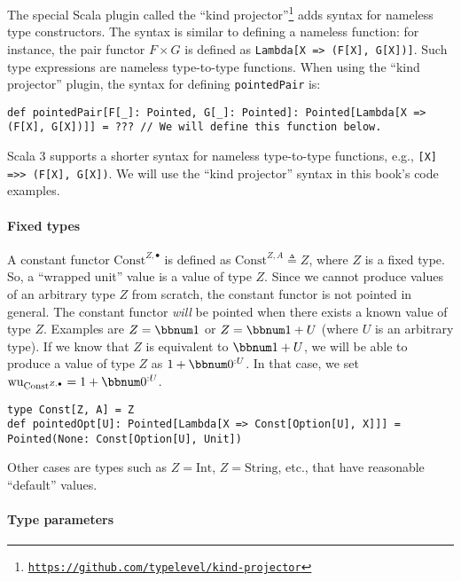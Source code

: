 The special Scala plugin called the \textsf{``}kind
projector\textsf{''}\footnote{\texttt{\href{https://github.com/typelevel/kind-projector}{https://github.com/typelevel/kind-projector}}}
adds syntax for nameless type constructors. The syntax is similar
to defining a nameless function: for instance, the pair functor $F\times G$
is defined as \lstinline!Lambda[X => (F[X], G[X])]!. Such type expressions
are nameless type-to-type functions.
When using the \textsf{``}kind projector\textsf{''} plugin, the syntax for defining
\lstinline!pointedPair! is:
\begin{lstlisting}
def pointedPair[F[_]: Pointed, G[_]: Pointed]: Pointed[Lambda[X => (F[X], G[X])]] = ??? // We will define this function below.
\end{lstlisting}
Scala 3 supports a shorter syntax for nameless type-to-type functions,
e.g., \lstinline![X] =>> (F[X], G[X])!. We will use the \textsf{``}kind projector\textsf{''}
syntax in this book\textsf{'}s code examples.

\paragraph{Fixed types}

A constant functor $\text{Const}^{Z,\bullet}$ is defined as $\text{Const}^{Z,A}\triangleq Z$,
where $Z$ is a fixed type. So, a \textsf{``}wrapped unit\textsf{''} value is a value
of type $Z$. Since we cannot produce values of an arbitrary type
$Z$ from scratch, the constant functor is not pointed in general.
The constant functor \emph{will} be pointed when there exists a known
value of type $Z$. Examples are $Z=\bbnum 1$ or $Z=\bbnum 1+U$
(where $U$ is an arbitrary type). If we know that $Z$ is equivalent
to $\bbnum 1+U$, we will be able to produce a value of type $Z$
as $1+\bbnum 0^{:U}$. In that case, we set $\text{wu}_{\text{Const}^{Z,\bullet}}=1+\bbnum 0^{:U}$.
\begin{lstlisting}
type Const[Z, A] = Z
def pointedOpt[U]: Pointed[Lambda[X => Const[Option[U], X]]] = Pointed(None: Const[Option[U], Unit])
\end{lstlisting}
Other cases are types such as $Z=\text{Int}$, $Z=\text{String}$,
etc., that have reasonable \textsf{``}default\textsf{''} values.

\paragraph{Type parameters}

